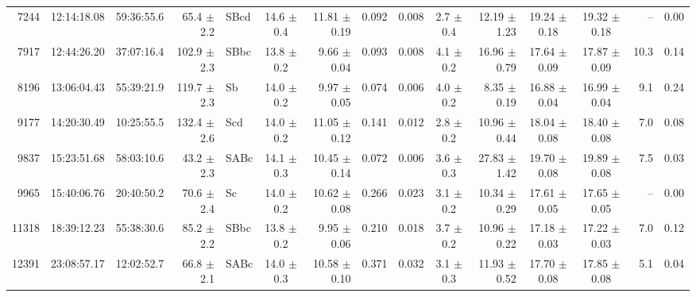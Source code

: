 \begin{table}
{\begin{tabular}{|rrrrlcrcccrccrc|}
 7244 & 12:14:18.08 & 59:36:55.6 &  65.4 $\pm$ 2.2 & SBcd      & 14.6 $\pm$ 0.4 & 11.81 $\pm$ 0.19 & 0.092 & 0.008 & 2.7 $\pm$ 0.4 & 12.19 $\pm$ 1.23 & 19.24 $\pm$ 0.18 & 19.32 $\pm$ 0.18 & --   & 0.00 \\
 7917 & 12:44:26.20 & 37:07:16.4 & 102.9 $\pm$ 2.3 & SBbc      & 13.8 $\pm$ 0.2 &  9.66 $\pm$ 0.04 & 0.093 & 0.008 & 4.1 $\pm$ 0.2 & 16.96 $\pm$ 0.79 & 17.64 $\pm$ 0.09 & 17.87 $\pm$ 0.09 & 10.3 & 0.14 \\
 8196 & 13:06:04.43 & 55:39:21.9 & 119.7 $\pm$ 2.3 & Sb        & 14.0 $\pm$ 0.2 &  9.97 $\pm$ 0.05 & 0.074 & 0.006 & 4.0 $\pm$ 0.2 &  8.35 $\pm$ 0.19 & 16.88 $\pm$ 0.04 & 16.99 $\pm$ 0.04 & 9.1  & 0.24 \\
 9177 & 14:20:30.49 & 10:25:55.5 & 132.4 $\pm$ 2.6 & Scd       & 14.0 $\pm$ 0.2 & 11.05 $\pm$ 0.12 & 0.141 & 0.012 & 2.8 $\pm$ 0.2 & 10.96 $\pm$ 0.44 & 18.04 $\pm$ 0.08 & 18.40 $\pm$ 0.08 & 7.0  & 0.08 \\
 9837 & 15:23:51.68 & 58:03:10.6 &  43.2 $\pm$ 2.3 & SABc      & 14.1 $\pm$ 0.3 & 10.45 $\pm$ 0.14 & 0.072 & 0.006 & 3.6 $\pm$ 0.3 & 27.83 $\pm$ 1.42 & 19.70 $\pm$ 0.08 & 19.89 $\pm$ 0.08 & 7.5  & 0.03 \\
 9965 & 15:40:06.76 & 20:40:50.2 &  70.6 $\pm$ 2.4 & Sc        & 14.0 $\pm$ 0.2 & 10.62 $\pm$ 0.08 & 0.266 & 0.023 & 3.1 $\pm$ 0.2 & 10.34 $\pm$ 0.29 & 17.61 $\pm$ 0.05 & 17.65 $\pm$ 0.05 & --   & 0.00 \\
11318 & 18:39:12.23 & 55:38:30.6 &  85.2 $\pm$ 2.2 & SBbc      & 13.8 $\pm$ 0.2 &  9.95 $\pm$ 0.06 & 0.210 & 0.018 & 3.7 $\pm$ 0.2 & 10.96 $\pm$ 0.22 & 17.18 $\pm$ 0.03 & 17.22 $\pm$ 0.03 & 7.0  & 0.12 \\
12391 & 23:08:57.17 & 12:02:52.7 &  66.8 $\pm$ 2.1 & SABc      & 14.0 $\pm$ 0.3 & 10.58 $\pm$ 0.10 & 0.371 & 0.032 & 3.1 $\pm$ 0.3 & 11.93 $\pm$ 0.52 & 17.70 $\pm$ 0.08 & 17.85 $\pm$ 0.08 & 5.1  & 0.04 \\
\hline
\end{tabular}
}
%
\end{table}

